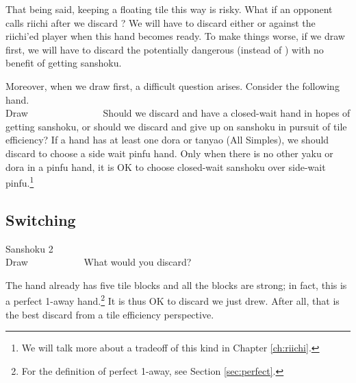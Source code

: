 \bigskip
That being said, keeping a floating tile this way is risky. What if an opponent calls riichi after we discard {\LARGE\bei}? We will have to discard either {\LARGE{}} or {\LARGE{}} against the riichi'ed player when this hand becomes ready. To make things worse, if we draw {\LARGE{}} first, we will have to discard the potentially dangerous {\LARGE{}} (instead of {\LARGE\bei}) with no benefit of getting {\jap sanshoku}. 

\bigskip
Moreover, when we draw {\LARGE{}} first, a difficult question arises. Consider the following hand. 
\bp
{}~\\
\hfill\footnotesize{Draw~~~~~~~~~~~~~~~}
\ep
Should we discard {\LARGE{}} and have a closed-wait hand in hopes of getting {\jap sanshoku}, or should we discard {\LARGE{}} and give up on {\jap sanshoku} in pursuit of tile efficiency?
If a hand has at least one {\jap dora} or {\jap tanyao} (All Simples), we should discard {\LARGE{}} to choose a side wait {\jap pinfu} hand. Only when there is no other {\jap yaku} or {\jap dora} in a {\jap pinfu} hand, it is OK to choose closed-wait {\jap sanshoku} over side-wait {\jap pinfu}.\footnote{We will talk more about a tradeoff of this kind in Chapter \ref{ch:riichi}.}



\newpage
\subsection{Switching} \label{sec:san2}

\begin{itembox}[r]{{\jap Sanshoku} 2}
\bp
{}~\\
\hfill\footnotesize{Draw~~~~~~~~~~~}
\ep
\vspace{-17pt}What would you discard? \vspace{-5pt}
\end{itembox}
\noindent
The hand already has five tile blocks and all the blocks are strong; in fact, this is a perfect 1-away hand.\footnote{For the definition of perfect 1-away, see Section \ref{sec:perfect}.} It is thus OK to discard {\LARGE{}} we just drew. After all, that is the best discard from a tile efficiency perspective. 

